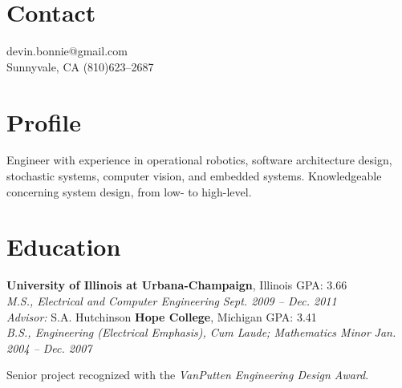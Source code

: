\documentclass[margin, line]{resume}
\begin{document}
\begin{resume}
\vspace{-2mm}
    \section{\mysidestyle Contact}

			  \hfill devin.bonnie@gmail.com \\ \vspace{-2mm}%
	Sunnyvale, CA                          \hfill   (810)623--2687 \vspace{0mm}\vspace{-2mm}%
    \section{\mysidestyle Profile}
   
Engineer with experience in operational robotics, software architecture design, stochastic systems, computer vision, and embedded systems. Knowledgeable concerning system design, from low- to high-level.  \vspace{-4mm}
    \section{\mysidestyle Education}
    \textbf{University of Illinois at Urbana-Champaign}, Illinois  \hfill GPA: 3.66 \vspace{0mm}\\%
    \textsl{M.S., Electrical and Computer Engineering} \hfill \textsl{Sept. 2009 -- Dec. 2011}\\
    \textsl{Advisor:} S.A. Hutchinson \vspace{-2mm} %
    \textbf{Hope College}, Michigan  \hfill GPA: 3.41\vspace{0mm}\\%
    \textsl{B.S., Engineering (Electrical Emphasis), Cum Laude; Mathematics Minor} \hfill \textsl{Jan. 2004 -- Dec. 2007}\vspace{-3mm}\\\vspace{-1mm}%
    \begin{list2}
        \item Senior project recognized with the \textit{VanPutten Engineering Design Award}.
    \end{list2}\vspace{-2mm}


\end{resume}
\end{document}
